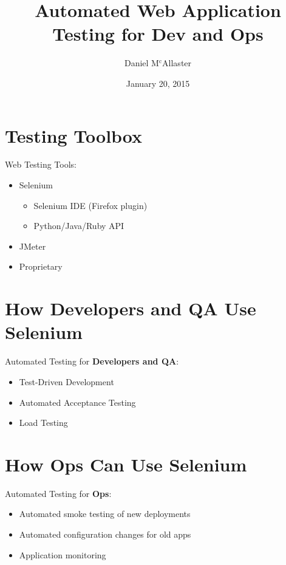 \documentclass[14pt]{beamer}
\title[Automated Web Application Testing]{Automated Web Application Testing for Dev and Ops}
\author{Daniel M$^\text{c}$Allaster}
\date{January 20, 2015}
\begin{document}
\frame{\titlepage}


\section[Toolbox]{Testing Toolbox}
\label{S:I}
\begin{frame}

Web Testing Tools:
\begin{itemize}
\item<+-> Selenium
  \begin{itemize}
  \item<+-> Selenium IDE (Firefox plugin)
  \item<+-> Python/Java/Ruby API
  \end{itemize}
\item<+-> JMeter
\item<+-> Proprietary
\end{itemize}

\end{frame}

\section[Developers]{How Developers and QA Use Selenium}

\begin{frame}
  Automated Testing for {\bf Developers and QA}:
  \begin{itemize}[<+->]
  \item Test-Driven Development
  \item Automated Acceptance Testing
  \item Load Testing
  \end{itemize}
\end{frame}

\section[Ops]{How Ops Can Use Selenium}

\begin{frame}
  Automated Testing for {\bf Ops}:
  \begin{itemize}[<+->]
  \item Automated smoke testing of new deployments
  \item Automated configuration changes for old apps
  \item Application monitoring
  \end{itemize}
\end{frame}
\end{document}
